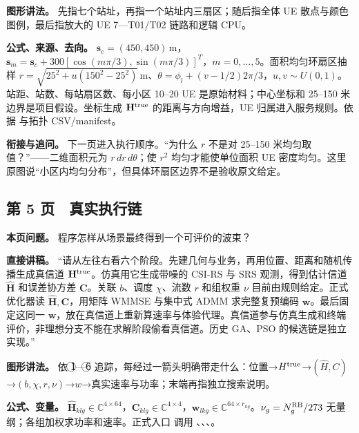 \documentclass[11pt,a4paper]{ctexart}
\begin{document}
\textbf{图形讲法。} 先指七个站址，再指一个站址内三扇区；随后指全体 UE 散点与颜色图例，最后指放大的 UE 7—T01/T02 链路和逻辑 CPU。\par

\textbf{公式、来源、去向。} $\mathbf s_c=(450,450)\,\mathrm m$，$\mathbf s_m=\mathbf s_c+300[\cos(m\pi/3),\sin(m\pi/3)]^T$，$m=0,\ldots,5$。面积均匀环扇区抽样 $r=\sqrt{25^2+u(150^2-25^2)}\,\mathrm m$、$\theta=\phi_l+(v-1/2)2\pi/3$，$u,v\sim U(0,1)$。站距、站数、每站扇区数、每小区 10–20 UE 是原始材料；中心坐标和 25–150 米边界是项目假设。坐标生成 $\mathbf H^{\rm true}$ 的距离与方向增益，UE 归属进入服务规则。依据  与拓扑 CSV/manifest。\par

\textbf{衔接与追问。} 下一页进入执行顺序。“为什么 $r$ 不是对 25–150 米均匀取值？”——二维面积元为 $r\,dr\,d\theta$；使 $r^2$ 均匀才能使单位面积 UE 密度均匀。这里原图说“小区内均匀分布”，但具体环扇区边界不是验收原文给定。\par

\subsection*{第 5 页　真实执行链}

\textbf{本页问题。} 程序怎样从场景最终得到一个可评价的波束？\par

\textbf{直接讲稿。} “请从左往右看六个阶段。先建几何与业务，再用位置、距离和随机传播生成真信道 $\mathbf H^{\rm true}$。仿真用它生成带噪的 CSI-RS 与 SRS 观测，得到估计信道 $\widehat{\mathbf H}$ 和误差协方差 $\mathbf C$。关联 $b$、调度 $\chi$、流数 $r$ 和组权重 $\nu$ 目前由规则给定。正式优化器读 $\widehat{\mathbf H},\mathbf C$，用矩阵 WMMSE 与集中式 ADMM 求完整复预编码 $\mathbf w$。最后固定这同一 $\mathbf w$，放在真信道上重新算速率与体验代理。真信道参与仿真生成和终端评价，非理想分支不能在求解阶段偷看真信道。历史 GA、PSO 的候选链是独立实现。”\par

\textbf{图形讲法。} 依 \textcircled{1}—\textcircled{6} 追踪，每经过一箭头明确带走什么：位置→$H^{\rm true}$→$(\widehat H,C)$→$(b,\chi,r,\nu)$→$w$→真实速率与功率；末端再指独立搜索说明。\par

\textbf{公式、变量。} $\widehat{\mathbf H}_{klg}\in\mathbb C^{4\times64}$，$\mathbf C_{klg}\in\mathbb C^{4\times4}$，$\mathbf w_{lkg}\in\mathbb C^{64\times r_{kg}}$。$\nu_g=N_g^{\rm RB}/273$ 无量纲；各组加权求功率和速率。正式入口  调用 、、、。\par
\end{document}
